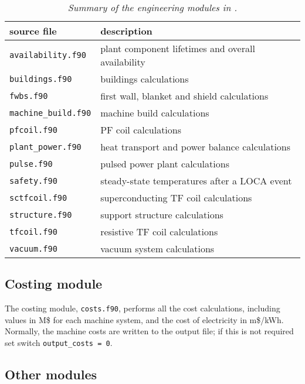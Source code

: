 \begin{table}[tbph]
\begin{center}

\begin{tabular}{||l||l||} \hline
source file     & description \\ \hline
\texttt{availability.f90} & plant component lifetimes and overall availability \\
\texttt{buildings.f90} & buildings calculations \\
\texttt{fwbs.f90} & first wall, blanket and shield calculations \\
\texttt{machine\_build.f90} & machine build calculations \\
\texttt{pfcoil.f90} & PF coil calculations \\
\texttt{plant\_power.f90} & heat transport and power balance calculations \\
\texttt{pulse.f90} & pulsed power plant calculations \\
\texttt{safety.f90} & steady-state temperatures after a LOCA event \\
\texttt{sctfcoil.f90} & superconducting TF coil calculations \\
\texttt{structure.f90} & support structure calculations \\
\texttt{tfcoil.f90} & resistive TF coil calculations \\
\texttt{vacuum.f90} & vacuum system calculations \\
\hline
\end{tabular}
\end{center}
\caption[Summary of engineering modules]
{\label{tab:engineering}
  \textit{Summary of the engineering modules in \process.}
}
\end{table}

\subsection{Costing module}

The costing module, \texttt{costs.f90}, performs all the cost calculations,
including values in M\$ for each machine system, and the cost of electricity
in m\$/kWh. Normally, the machine costs are written to the output file; if
this is not required set switch \texttt{output\_costs = 0}.

\subsection{Other modules}

